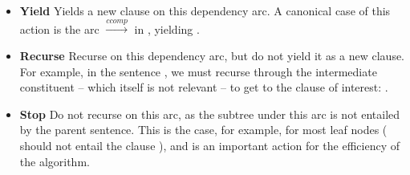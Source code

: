 \vspace{-1ex}
\begin{itemize}[leftmargin=2ex]
\item[] \textbf{Yield} \hspace{1ex}
  Yields a new clause on this dependency arc.
  A canonical case of this action is the arc 
     $\xrightarrow{ccomp}$  in
    , yielding
    .

\item[] \textbf{Recurse} \hspace{1ex}
  Recurse on this dependency arc, but do not yield it as a new clause.
  For example, in the sentence , we must recurse through the intermediate constituent
   -- which itself is not relevant
  -- to get to the clause of interest: .

\item[] \textbf{Stop}  \hspace{1ex}
  Do not recurse on this arc, as the subtree under this arc is
    not entailed by the parent sentence.
  This is the case, for example, for most leaf nodes
    ( should not entail the clause ),
    and is an important action for the efficiency of the algorithm.
\end{itemize}

